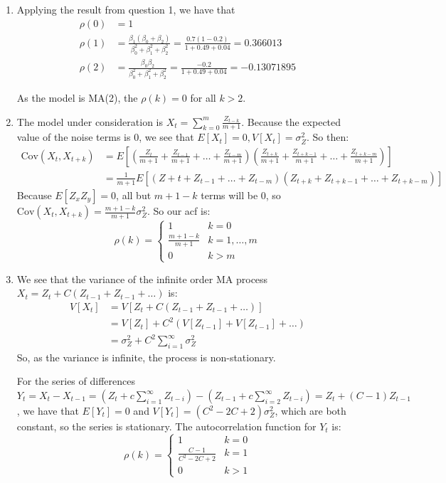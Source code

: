 \documentclass[11pt]{article} %
\newcommand{\tr}{\textrm}
\newcommand{\cov}{\tr{Cov}}
\begin{document}
\begin{enumerate}
\begin{enumerate}
\end{enumerate}

\item Applying the result from question 1, we have that
\begin{align*}\rho(0) &= 1\\
\rho(1) &= \frac{\beta_1(\beta_0+\beta_2)}{\beta_0^2+\beta_1^2+\beta_2^2} = \frac{0.7(1-0.2)}{1+0.49+0.04} = 0.366013\\
\rho(2) &= \frac{\beta_0\beta_2}{\beta_0^2+\beta_1^2+\beta_2^2} = \frac{-0.2}{1+0.49+0.04} = -0.13071895\end{align*}

As the model is MA(2), the $\rho(k) = 0$ for all $k > 2$.

\newpage

\item The model under consideration is $X_t = \sum_{k=0}^m \frac{Z_{t-k}}{m+1}$. Because the expected value of the noise terms is 0, we see that $E[X_t] = 0, V[X_t] = \sigma_Z^2$. So then:
\begin{align*}\cov(X_t, X_{t+k}) &= E\left[\left(\frac{Z_t}{m+1}+\frac{Z_{t-1}}{m+1}+\ldots+\frac{Z_{t-m}}{m+1}\right)\left(\frac{Z_{t+k}}{m+1}+\frac{Z_{t+k-1}}{m+1}+\ldots+\frac{Z_{t+k-m}}{m+1}\right)\right]\\
&= \frac{1}{m+1}E[(Z+t + Z_{t-1} + \ldots + Z_{t-m})(Z_{t+k} + Z_{t+k-1} + \ldots + Z_{t+k-m})]\end{align*}
Because $E[Z_xZ_y] = 0$, all but $m+1-k$ terms will be 0, so $\cov(X_t, X_{t+k}) = \frac{m+1-k}{m+1}\sigma_Z^2$. So our acf is:
$$\rho(k)=
\begin{cases}
   1 &  k = 0 \\
    \frac{m+1-k}{m+1}    &  k = 1,\ldots,m\\
   0 &  k > m
  \end{cases}$$

\item We see that the variance of the infinite order MA process $X_t = Z_t + C(Z_{t-1}+Z_{t-1}+\ldots)$ is:
\begin{align*}V[X_t] &= V[Z_t + C(Z_{t-1}+Z_{t-1}+\ldots)]\\
& = V[Z_t] + C^2(V[Z_{t-1}] + V[Z_{t-1}] + \ldots)\\
& = \sigma_Z^2 + C^2 \sum_{i=1}^\infty \sigma_Z^2\end{align*}
So, as the variance is infinite, the process is non-stationary.
  
For the series of differences $Y_t = X_t-X_{t-1} = (Z_t + c\sum_{i=1}^\infty Z_{t-i}) - (Z_{t-1} + c\sum_{i=2}^{\infty}Z_{t-i}) = Z_t +(C-1)Z_{t-1}$, we have that $E[Y_t] = 0$ and $V[Y_t] = (C^2-2C+2)\sigma_Z^2$, which are both constant, so the series is stationary. The autocorrelation function for $Y_t$ is:
$$\rho(k)= \begin{cases}
1 &  k = 0 \\
\frac{C-1}{C^2-2C+2}    &  k = 1\\
0 &  k > 1
\end{cases}$$


\end{enumerate}
\end{document}
